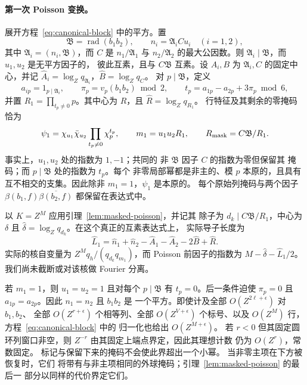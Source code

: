 \paragraph{第一次 Poisson 变换。}
展开方程~\eqref{eq:canonical-block} 中的平方。置
\[
 \mathfrak B=\operatorname{rad}(b_1b_2),\qquad
 n_i=\mathfrak A_i C u_i\quad(i=1,2),
\]
其中 \(\mathfrak A_i=(n_i,\mathfrak B)\)，而 \(C\) 是
\(n_1/\mathfrak A_1\) 与 \(n_2/\mathfrak A_2\) 的最大公因数。则
\(\mathfrak A_i\mid\mathfrak B\)，而 \(u_1,u_2\) 是无平方因子的，
彼此互素，且与 \(C\mathfrak B\) 互素。设 \(A_i,B\)
为 \(\mathfrak A_i,C\) 的固定中心，并记
\(\widehat A_i=\log_Zq_{\mathfrak A_i}\)，\(\widehat B=\log_Zq_C\)。
对 \(p\mid\mathfrak B\)，定义
\[
 a_{ip}=1_{p\mid\mathfrak A_i},\qquad
 \pi_p=v_p(b_1b_2)\bmod2,\qquad
 t_p=a_{1p}-a_{2p}+3\pi_p\bmod6,
\]
并置 \(R_1=\prod_{t_p\ne0}p\)。其中心为 \(R\)，且
\(\widehat R=\log_Zq_{R_1}\)。
行特征及其剩余的零掩码恰为
\begin{equation}\label{eq:first-masked-data}
 \psi_1=\chi_{u_1}\bar\chi_{u_2}
               \prod_{t_p\ne0}\chi_p^{t_p},\qquad
 m_1=u_1u_2R_1,\qquad
 R_{\rm mask}=C\mathfrak B/R_1.
\end{equation}
事实上，\(u_1,u_2\) 处的指数为 \(1,-1\)；共同的
非 \(\mathfrak B\) 因子 \(C\) 的指数为零但保留其
掩码；而 \(p\mid\mathfrak B\) 处的指数为 \(t_p\)。每个
非零局部幂都是非主的、模 \(p\) 本原的，且具有
互不相交的支集。因此除非 \(m_1=1\)，\(\psi_1\) 是本原的。
每个原始列掩码与两个因子
\(\beta(b_1,f)\overline{\beta(b_2,f)}\) 都保留在表达式中。

以 \(K=Z^M\) 应用引理~\ref{lem:masked-poisson}，并记其
除子为 \(d_k\mid C\mathfrak B/R_1\)，中心为 \(\delta\) 且
\(\widehat\delta=\log_Zq_{d_k}\)。在这个真正的互素表达式上，
实际导子长度为
\begin{equation}\label{eq:first-poisson-lengths}
 \widehat L_1=\widehat n_1+\widehat n_2-\widehat A_1-\widehat A_2
                    -2\widehat B+\widehat R.
\end{equation}
实际的核自变量为 \(Z^Mq_h/(q_{d_k}q_{m_1})\)，而
Poisson 前因子的指数为 \(M-\widehat\delta-\widehat L_1/2\)。
我们尚未截断或对该核做 Fourier 分离。

若 \(m_1=1\)，则 \(u_1=u_2=1\) 且对每个
\(p\mid\mathfrak B\) 有 \(t_p=0\)。后一条件迫使 \(\pi_p=0\)
且 \(a_{1p}=a_{2p}\)。因此 \(n_1=n_2\) 且 \(b_1b_2\) 是
一个平方。即使计及全部 \(O(Z^{2\ell+\epsilon})\) 对 \(b_1,b_2\)、
全部 \(O(Z^{r+\epsilon})\) 个相等列、全部 \(O(Z^{V+\epsilon})\)
个标号、以及 \(O(Z^M)\) 行，方程~\eqref{eq:canonical-block} 中的
归一化也给出 \(O(Z^{M+\epsilon})\)。
若 \(r<0\) 但其固定圆环列窗口非空，则
\(Z^{-r}\) 由其固定上端点界定，因此其理想计数
仍为 \(O(Z^r)\)，常数固定。
标记与保留下来的掩码不会使此界超出一个小幂。
当非零主项在下方被恢复时，它们
将带有与非主项相同的外球掩码；引理~\ref{lem:masked-poisson} 的最后一
部分以同样的代价界定它们。

